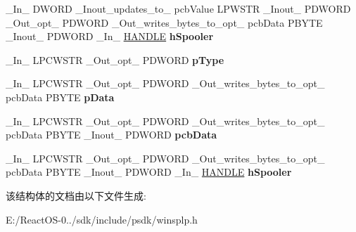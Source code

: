 \begin{DoxyCompactItemize}
\item 
\mbox{\label{struct___m_o_n_i_t_o_r_r_e_g_ac1e7c8833529121e56e2538e4bdeb6cb}} 
\+\_\+\+In\+\_\+ D\+W\+O\+RD \+\_\+\+Inout\+\_\+updates\+\_\+to\+\_\+ pcb\+Value L\+P\+W\+S\+TR \+\_\+\+Inout\+\_\+ P\+D\+W\+O\+RD \+\_\+\+Out\+\_\+opt\+\_\+ P\+D\+W\+O\+RD \+\_\+\+Out\+\_\+writes\+\_\+bytes\+\_\+to\+\_\+opt\+\_\+ pcb\+Data P\+B\+Y\+TE \+\_\+\+Inout\+\_\+ P\+D\+W\+O\+RD \+\_\+\+In\+\_\+ \hyperlink{interfacevoid}{H\+A\+N\+D\+LE} {\bfseries h\+Spooler}
\item 
\mbox{\label{struct___m_o_n_i_t_o_r_r_e_g_ae06873cb82b401f4e8c80c9b775c3b04}} 
\+\_\+\+In\+\_\+ L\+P\+C\+W\+S\+TR \+\_\+\+Out\+\_\+opt\+\_\+ P\+D\+W\+O\+RD {\bfseries p\+Type}
\item 
\mbox{\label{struct___m_o_n_i_t_o_r_r_e_g_a567b2f186adcf4a263f6c2c329d4afbe}} 
\+\_\+\+In\+\_\+ L\+P\+C\+W\+S\+TR \+\_\+\+Out\+\_\+opt\+\_\+ P\+D\+W\+O\+RD \+\_\+\+Out\+\_\+writes\+\_\+bytes\+\_\+to\+\_\+opt\+\_\+ pcb\+Data P\+B\+Y\+TE {\bfseries p\+Data}
\item 
\mbox{\label{struct___m_o_n_i_t_o_r_r_e_g_a3b439bbad4420c738a8a173ba6ec1e24}} 
\+\_\+\+In\+\_\+ L\+P\+C\+W\+S\+TR \+\_\+\+Out\+\_\+opt\+\_\+ P\+D\+W\+O\+RD \+\_\+\+Out\+\_\+writes\+\_\+bytes\+\_\+to\+\_\+opt\+\_\+ pcb\+Data P\+B\+Y\+TE \+\_\+\+Inout\+\_\+ P\+D\+W\+O\+RD {\bfseries pcb\+Data}
\item 
\mbox{\label{struct___m_o_n_i_t_o_r_r_e_g_a033eba2e46d49757bef74549111ffc10}} 
\+\_\+\+In\+\_\+ L\+P\+C\+W\+S\+TR \+\_\+\+Out\+\_\+opt\+\_\+ P\+D\+W\+O\+RD \+\_\+\+Out\+\_\+writes\+\_\+bytes\+\_\+to\+\_\+opt\+\_\+ pcb\+Data P\+B\+Y\+TE \+\_\+\+Inout\+\_\+ P\+D\+W\+O\+RD \+\_\+\+In\+\_\+ \hyperlink{interfacevoid}{H\+A\+N\+D\+LE} {\bfseries h\+Spooler}
\end{DoxyCompactItemize}


该结构体的文档由以下文件生成\+:\begin{DoxyCompactItemize}
\item 
E\+:/\+React\+O\+S-\/0../sdk/include/psdk/winsplp.\+h\end{DoxyCompactItemize}
